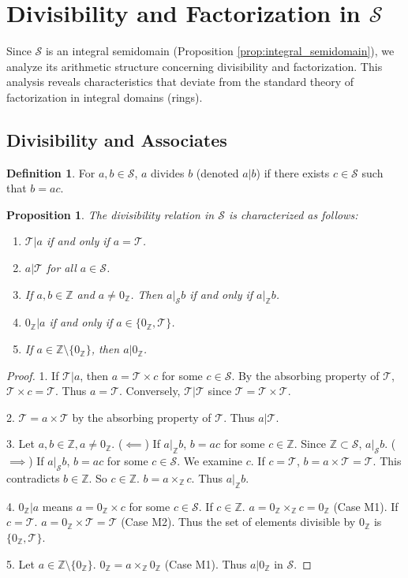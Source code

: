 \documentclass[11pt, a4paper]{article}
\theoremstyle{plain}
\newtheorem{proposition}[theorem]{Proposition}
\theoremstyle{definition}
\newtheorem{definition}[theorem]{Definition}
\numberwithin{equation}{section}
\newcommand{\Z}{\mathbb{Z}}
\newcommand{\Tobj}{\mathcal{T}} %
\newcommand{\SemiringS}{\mathcal{S}}
\begin{document}
\section{Divisibility and Factorization in $\SemiringS$}

Since $\SemiringS$ is an integral semidomain (Proposition \ref{prop:integral_semidomain}), we analyze its arithmetic structure concerning divisibility and factorization. This analysis reveals characteristics that deviate from the standard theory of factorization in integral domains (rings).

\subsection{Divisibility and Associates}

\begin{definition}
For $a, b \in \SemiringS$, $a$ divides $b$ (denoted $a|b$) if there exists $c \in \SemiringS$ such that $b=ac$.
\end{definition}

\begin{proposition}\label{prop:divisibility_S}
The divisibility relation in $\SemiringS$ is characterized as follows:
\begin{enumerate}
    \item $\Tobj|a$ if and only if $a=\Tobj$.
    \item $a|\Tobj$ for all $a \in \SemiringS$.
    \item If $a, b \in \Z$ and $a\neq 0_{\Z}$. Then $a|_{\SemiringS} b$ if and only if $a|_{\Z} b$.
    \item $0_{\Z}|a$ if and only if $a \in \{0_{\Z}, \Tobj\}$.
    \item If $a \in \Z\setminus\{0_{\Z}\}$, then $a|0_{\Z}$.
\end{enumerate}
\end{proposition}
\begin{proof}
1. If $\Tobj|a$, then $a=\Tobj\times c$ for some $c \in \SemiringS$. By the absorbing property of $\Tobj$, $\Tobj\times c = \Tobj$. Thus $a=\Tobj$. Conversely, $\Tobj|\Tobj$ since $\Tobj=\Tobj\times\Tobj$.

2. $\Tobj = a\times\Tobj$ by the absorbing property of $\Tobj$. Thus $a|\Tobj$.

3. Let $a, b \in \Z, a\neq 0_{\Z}$.
($\impliedby$) If $a|_{\Z} b$, $b=ac$ for some $c\in\Z$. Since $\Z \subset \SemiringS$, $a|_{\SemiringS} b$.
($\implies$) If $a|_{\SemiringS} b$, $b=ac$ for some $c\in\SemiringS$. We examine $c$. If $c=\Tobj$, $b=a\times\Tobj=\Tobj$. This contradicts $b\in\Z$. So $c\in\Z$. $b=a\times_{\Z} c$. Thus $a|_{\Z} b$.

4. $0_{\Z}|a$ means $a=0_{\Z}\times c$ for some $c \in \SemiringS$.
If $c \in \Z$. $a=0_{\Z}\times_{\Z} c = 0_{\Z}$ (Case M1).
If $c=\Tobj$. $a=0_{\Z}\times\Tobj = \Tobj$ (Case M2).
Thus the set of elements divisible by $0_{\Z}$ is $\{0_{\Z}, \Tobj\}$.

5. Let $a \in \Z\setminus\{0_{\Z}\}$. $0_{\Z} = a\times_{\Z} 0_{\Z}$ (Case M1). Thus $a|0_{\Z}$ in $\SemiringS$.
\end{proof}
\end{document}
